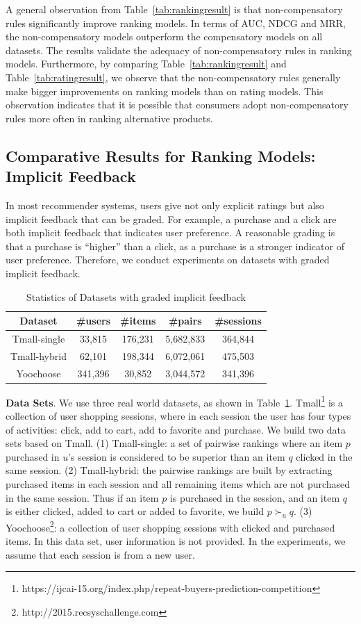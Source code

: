 \documentclass[letterpaper]{article} %
\begin{document}
A general observation from Table~\ref{tab:rankingresult} is that non-compensatory rules significantly improve ranking models. In terms of AUC, NDCG and MRR, the non-compensatory models outperform the compensatory models on all datasets. The results validate the adequacy of non-compensatory rules in ranking  models. Furthermore, by comparing Table~\ref{tab:rankingresult} and Table~\ref{tab:ratingresult}, we observe that the non-compensatory rules generally make bigger improvements on ranking models than on rating models. This observation indicates that it is possible that consumers adopt non-compensatory rules more often in ranking alternative products.
\subsection{Comparative Results for Ranking Models: Implicit Feedback}
In most recommender systems, users give not only explicit ratings but also implicit feedback that can be graded. For example, a purchase and a click are both implicit feedback that indicates user preference. A reasonable grading is that a purchase is ``higher'' than a click, as a purchase is a stronger indicator of user preference. Therefore, we conduct experiments on datasets with graded implicit feedback.  

\begin{table}[htp]
\caption{Statistics of Datasets with graded implicit feedback}
\scriptsize
\begin{center}
\begin{tabular}{|c|c|c|c|c|}
\hline
Dataset & \#users & \#items & \#pairs & \#sessions \\\hline
Tmall-single &33,815 &176,231 &5,682,833 &364,844 \\\hline
Tmall-hybrid &62,101 &198,344 &6,072,061 &475,503 \\\hline
Yoochoose &341,396 &30,852 &3,044,572 &341,396 \\\hline
\end{tabular}
\end{center}
\label{tab:idata}
\end{table}%

\textbf{Data Sets}. We use three real world datasets, as shown in Table~\ref{tab:idata}. Tmall\footnote{https://ijcai-15.org/index.php/repeat-buyers-prediction-competition} is a collection of user shopping sessions, where in each session the user has four types of activities: click, add to cart, add to favorite and purchase. We build two data sets based on Tmall. (1) Tmall-single: a set of pairwise rankings where an item $p$ purchased in $u$'s session is considered to be superior than an item $q$ clicked in the same session. (2) Tmall-hybrid: the pairwise rankings are built by extracting purchased items in each session and all remaining items which are not purchased in the same session. Thus if an item $p$ is purchased in the session, and an item $q$ is either clicked, added to cart or added to favorite, we build $p\succ_u q$. (3) Yoochoose\footnote{http://2015.recsyschallenge.com}: a collection of user shopping sessions with clicked and purchased items. In this data set, user information is not provided. In the experiments, we assume that each session is from a new user. 
\end{document}
